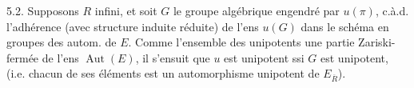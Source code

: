 5.2. Supposons $R$ infini, et soit $G$ le groupe algébrique engendré par $u(\pi)$,  c.à.d. l'adhérence (avec structure induite réduite) de l'ens $u(G)$ dans le schéma en groupes des autom. de $E$. Comme l'ensemble des   unipotents  une partie Zariski-fermée de l'ens $\operatorname{Aut}(E)$, il s'ensuit que $u$ est unipotent ssi $G$ est unipotent, (i.e. chacun de ses éléments  est un automorphisme unipotent de $E_{\overline R}$).


